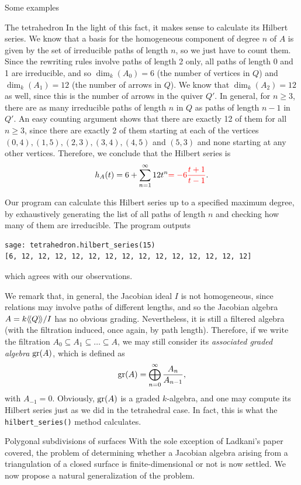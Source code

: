 \begin{chapter}{Some examples}
\begin{section}{The tetrahedron}
In the light of this fact, it makes sense to calculate its Hilbert series. We know that a basis for the homogeneous component of degree $n$ of $A$ is given by the set of irreducible paths of length $n$, so we just have to count them. Since the rewriting rules involve paths of length 2 only, all paths of length 0 and 1 are irreducible, and so $\dim_k(A_0)=6$ (the number of vertices in $Q$) and $\dim_k(A_1)=12$ (the number of arrows in $Q$). We know that $\dim_k(A_2)=12$ as well, since this is the number of arrows in the quiver $Q'$. In general, for $n\geq 3$, there are as many irreducible paths of length $n$ in $Q$ as paths of length $n-1$ in $Q'$. An easy counting argument shows that there are exactly 12 of them for all $n\geq 3$, since there are exactly 2 of them starting at each of the vertices $(0,4),(1,5), (2,3), (3,4), (4,5)$ and $(5,3)$ and none starting at any other vertices. Therefore, we conclude that the Hilbert series is
\[h_A(t)=6+\sum_{n=1}^\infty 12 t^n\textcolor{red}{=-6\frac{t+1}{t-1}}.\]

Our program can calculate this Hilbert series up to a specified maximum degree, by exhaustively generating the list of all paths of length $n$ and checking how many of them are irreducible. The program outputs
\begin{lstlisting}
sage: tetrahedron.hilbert_series(15)
[6, 12, 12, 12, 12, 12, 12, 12, 12, 12, 12, 12, 12, 12, 12]
\end{lstlisting}
which agrees with our observations.

\label{graded-alg}We remark that, in general, the Jacobian ideal $I$ is not homogeneous, since relations may involve paths of different lengths, and so the Jacobian algebra $A=k\langle\!\langle Q\rangle\!\rangle/I$ has no obvious grading. Nevertheless, it is still a filtered algebra (with the filtration induced, once again, by path length). Therefore, if we write the filtration $A_0\subseteq A_1\subseteq\dots\subseteq A$, we may still consider its \emph{associated graded algebra} $\operatorname{gr}(A)$, which is defined as
\[\operatorname{gr}(A) = \bigoplus_{n=0}^\infty \frac{A_n}{A_{n-1}},\]
with $A_{-1}=0$. Obviously, $\operatorname{gr}(A)$ is a graded $k$-algebra, and one may compute its Hilbert series just as we did in the tetrahedral case. In fact, this is what the \texttt{hilbert\_series()} method calculates.
\end{section}

\begin{section}{Polygonal subdivisions of surfaces}
With the sole exception of Ladkani's paper covered, the problem of determining whether a Jacobian algebra arising from a triangulation of a closed surface is finite-dimensional or not is now settled. We now propose a natural generalization of the problem.


\end{section}
\end{chapter}
